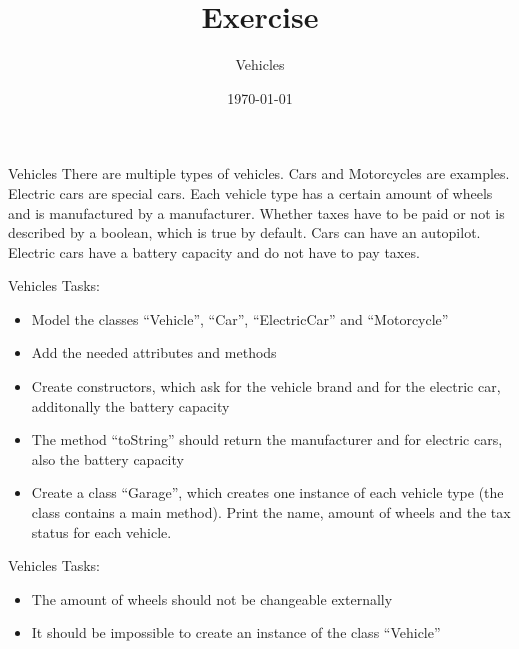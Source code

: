 


\title{Exercise}
\subtitle{Vehicles}
\date{\today}




\begin{frame}
    \titlepage
\end{frame}

\begin{frame}{Vehicles}
    There are multiple types of vehicles. Cars and Motorcycles are examples. Electric cars are special cars. Each vehicle type has a certain amount of wheels and is manufactured by a manufacturer. Whether taxes have to be paid or not is described by a boolean, which is true by default. Cars can have an autopilot. Electric cars have a battery capacity and do not have to pay taxes.
\end{frame}

\begin{frame}{Vehicles}
    Tasks:
    \begin{itemize}
        \item Model the classes ``Vehicle'', ``Car'', ``ElectricCar'' and ``Motorcycle''
        \item Add the needed attributes and methods
        \item Create constructors, which ask for the vehicle brand and for the electric car, additonally the battery capacity
        \item The method ``toString'' should return the manufacturer and for electric cars, also the battery capacity
        \item Create a class ``Garage'', which creates one instance of each vehicle type (the class contains a main method). Print the name, amount of wheels and the tax status for each vehicle.
    \end{itemize}
\end{frame}

\begin{frame}{Vehicles}
    Tasks:
    \begin{itemize}
        \item The amount of wheels should not be changeable externally
        \item It should be impossible to create an instance of the class ``Vehicle''
    \end{itemize}
\end{frame}



